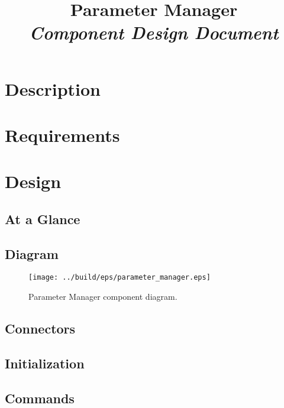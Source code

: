 



\title{\textbf{Parameter Manager} \\
\large\textit{Component Design Document}}
\date{}
\maketitle

\section{Description}


\section{Requirements}


\section{Design}

\subsection{At a Glance}


\subsection{Diagram}
\begin{figure}[H]
  \texttt{[image: ../build/eps/parameter\_manager.eps]}
  \caption{Parameter Manager component diagram.}
\end{figure}

\subsection{Connectors}


\subsection{Initialization}


\subsection{Commands}

